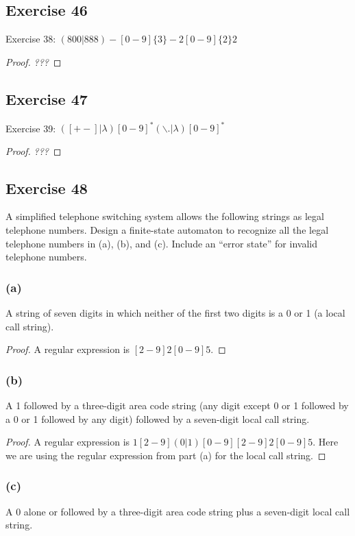 \documentclass[14pt]{extarticle}
\begin{document}
\subsection{Exercise 46}
Exercise 38: \((800|888)-[0-9]\{3\}-2[0-9]\{2\}2\)
\begin{proof}
{\it ???}
\end{proof}

\subsection{Exercise 47}
Exercise 39: \(([+ -] | \lambda)[0 - 9]^* (\backslash. | \lambda)[0 - 9]^*\)
\begin{proof}
{\it ???}
\end{proof}

\subsection{Exercise 48}
A simplified telephone switching system allows the following strings as legal telephone numbers. Design a finite-state 
automaton to recognize all the legal telephone numbers in (a), (b), and (c). Include an “error state” for invalid telephone 
numbers.

\subsubsection{(a)}
A string of seven digits in which neither of the first two digits is a 0 or 1 (a local call string).

\begin{proof}
A regular expression is \([2-9]{2}[0-9]{5}\).
\end{proof}

\subsubsection{(b)}
A 1 followed by a three-digit area code string (any digit except 0 or 1 followed by a 0 or 1 followed by any digit) 
followed by a seven-digit local call string.

\begin{proof}
A regular expression is \(1[2-9](0|1)[0-9][2-9]{2}[0-9]{5}\). Here we are using the regular expression from part (a) for the
local call string.
\end{proof}

\subsubsection{(c)}
A 0 alone or followed by a three-digit area code string plus a seven-digit local call string.
\end{document}

